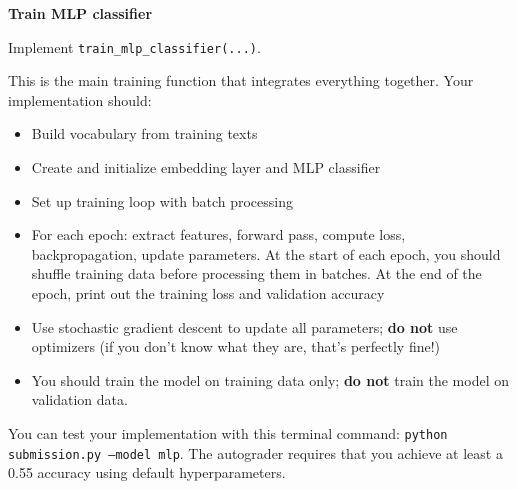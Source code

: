 \item {} \textbf{Train MLP classifier}

Implement \texttt{train\_mlp\_classifier(...)}.

This is the main training function that integrates everything together.
Your implementation should:

\begin{itemize}
    \item Build vocabulary from training texts
    \item Create and initialize embedding layer and MLP classifier
    \item Set up training loop with batch processing
    \item For each epoch: extract features, forward pass, compute loss, backpropagation, update parameters. At the start of each epoch, you should shuffle training data before processing them in batches. At the end of the epoch, print out the training loss and validation accuracy
    \item Use stochastic gradient descent to update all parameters; \textbf{do not} use optimizers (if you don't know what they are, that's perfectly fine!)
    \item You should train the model on training data only; \textbf{do not} train the model on validation data.
\end{itemize}

You can test your implementation with this terminal command: \texttt{python submission.py --model mlp}.
The autograder requires that you achieve at least a 0.55 accuracy using default hyperparameters.